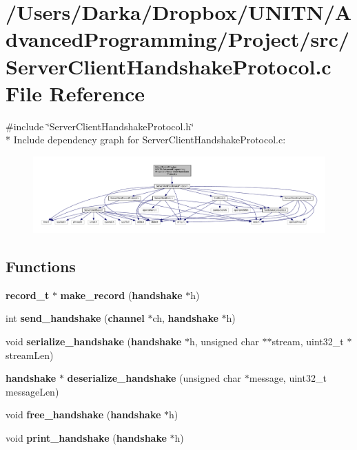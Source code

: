 \section{/\+Users/\+Darka/\+Dropbox/\+U\+N\+I\+T\+N/\+Advanced\+Programming/\+Project/src/\+Server\+Client\+Handshake\+Protocol.c File Reference}
\label{_server_client_handshake_protocol_8c}
{\ttfamily \#include \char`\"{}Server\+Client\+Handshake\+Protocol.\+h\char`\"{}}\\*
Include dependency graph for Server\+Client\+Handshake\+Protocol.\+c\+:\nopagebreak
\begin{figure}[H]
\begin{center}
\leavevmode
\includegraphics[width=350pt]{_server_client_handshake_protocol_8c__incl}
\end{center}
\end{figure}
\subsection*{Functions}
\begin{DoxyCompactItemize}
\item 
{\bf record\+\_\+t} $\ast$ {\bf make\+\_\+record} ({\bf handshake} $\ast$h)
\item 
int {\bf send\+\_\+handshake} ({\bf channel} $\ast$ch, {\bf handshake} $\ast$h)
\item 
void {\bf serialize\+\_\+handshake} ({\bf handshake} $\ast$h, unsigned char $\ast$$\ast$stream, uint32\+\_\+t $\ast$stream\+Len)
\item 
{\bf handshake} $\ast$ {\bf deserialize\+\_\+handshake} (unsigned char $\ast$message, uint32\+\_\+t message\+Len)
\item 
void {\bf free\+\_\+handshake} ({\bf handshake} $\ast$h)
\item 
void {\bf print\+\_\+handshake} ({\bf handshake} $\ast$h)
\end{DoxyCompactItemize}


